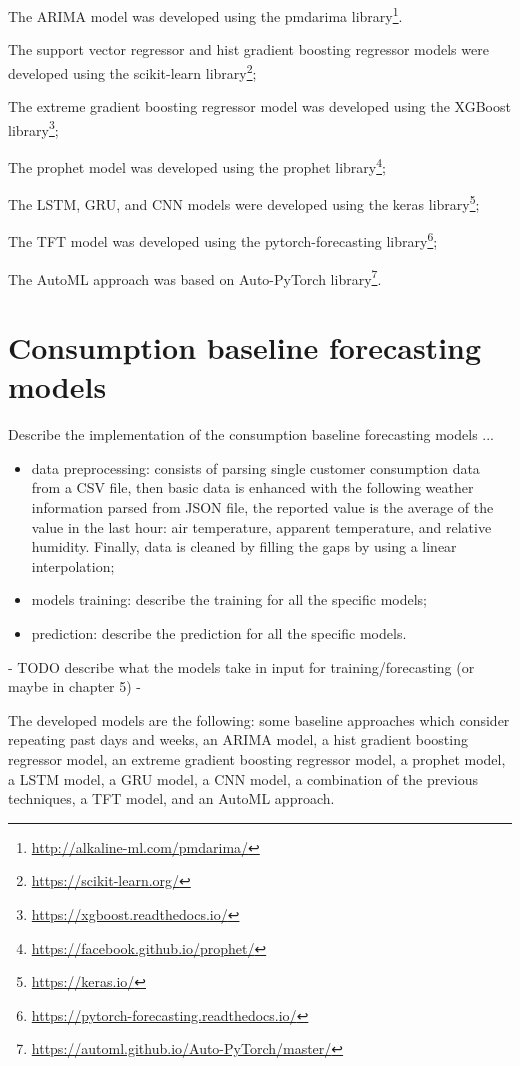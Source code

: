 The ARIMA model was developed using the pmdarima library\footnote{ \url{http://alkaline-ml.com/pmdarima/} }.

The support vector regressor and hist gradient boosting regressor models were developed using the scikit-learn library\footnote{ \url{https://scikit-learn.org/} };

The extreme gradient boosting regressor model was developed using the XGBoost library\footnote{ \url{https://xgboost.readthedocs.io/} };

The prophet model was developed using the prophet library\footnote{ \url{https://facebook.github.io/prophet/} };

The LSTM, GRU, and CNN models were developed using the keras library\footnote{ \url{https://keras.io/} };

The TFT model was developed using the pytorch-forecasting library\footnote{ \url{https://pytorch-forecasting.readthedocs.io/} };

The AutoML approach was based on Auto-PyTorch library\footnote{ \url{https://automl.github.io/Auto-PyTorch/master/} }.


\section{Consumption baseline forecasting models}
\label{sec:baselineimpl}
\vspace{0.2 cm}

Describe the implementation of the consumption baseline forecasting models ...
\begin{itemize}
  \item data preprocessing: consists of parsing single customer consumption data from a CSV file, then basic data is enhanced with the following weather information parsed from JSON file, the reported value is the average of the value in the last hour: air temperature, apparent temperature, and relative humidity. Finally, data is cleaned by filling the gaps by using a linear interpolation;
  \item models training: describe the training for all the specific models;
  \item prediction: describe the prediction for all the specific models.
\end{itemize}


 - TODO describe what the models take in input for training/forecasting (or maybe in chapter 5) -


The developed models are the following: some baseline approaches which consider repeating past days and weeks, an ARIMA model, a hist gradient boosting regressor model, an extreme gradient boosting regressor model, a prophet model, a LSTM model, a GRU model, a CNN model, a combination of the previous techniques, a TFT model, and an AutoML approach.

